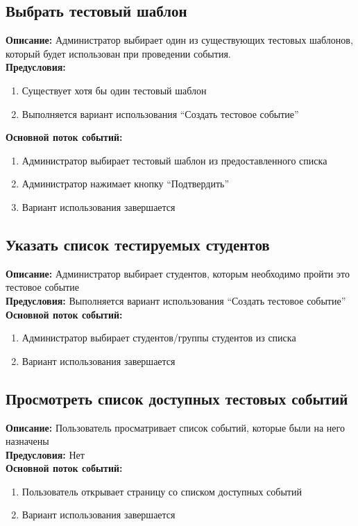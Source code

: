 \documentclass{article}
\begin{document}
    \subsection{Выбрать тестовый шаблон}
    \textbf{Описание:} Администратор выбирает один из существующих тестовых
    шаблонов, который будет использован при проведении события.\\
    \textbf{Предусловия:}
    \begin{enumerate}
       \item Существует хотя бы один тестовый шаблон
       \item Выполняется вариант использования “Создать тестовое событие”
    \end{enumerate}
    \textbf{Основной поток событий:}
    \begin{enumerate}
        \item Администратор выбирает тестовый шаблон из предоставленного списка
        \item Администратор нажимает кнопку “Подтвердить”
        \item Вариант использования завершается    
    \end{enumerate}


    \subsection{Указать список тестируемых студентов}
    \textbf{Описание:} Администратор выбирает студентов, которым
    необходимо пройти это тестовое событие\\
    \textbf{Предусловия:} Выполняется вариант использования “Создать
    тестовое событие”\\
    \textbf{Основной поток событий:}
    \begin{enumerate}
        \item Администратор выбирает студентов/группы студентов из списка
        \item Вариант использования завершается
    \end{enumerate}


    \subsection{Просмотреть список доступных тестовых событий}
    \textbf{Описание:} Пользователь просматривает список событий, которые были на него назначены\\
    \textbf{Предусловия:} Нет\\
    \textbf{Основной поток событий:}
    \begin{enumerate}
        \item Пользователь открывает страницу со списком доступных событий
        \item Вариант использования завершается
    \end{enumerate}
\end{document}
